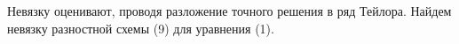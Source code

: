 \documentclass[a4paper,14pt]{article}
\begin{document}
\begin{figure}[!h]
	\label{fig:t271}
\end{figure}

Невязку оценивают, проводя разложение точного решения в ряд Тейлора. Найдем
невязку разностной схемы (9) для уравнения (1).
\newpage
\begin{figure}[!h]
	\label{fig:t272}
\end{figure}
\end{document}
